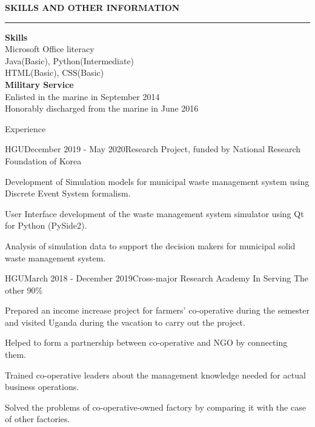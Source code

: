 \documentclass{resume} %
\begin{document}
{\bf \MakeUppercase {Skills and Other Information} %
  \sectionlineskip
  \hrule
  }
\begin{multicols}{2}
{\bf Skills}
  \\Microsoft Office literacy
  \\Java(Basic), Python(Intermediate) 
  \\HTML(Basic), CSS(Basic)
\\{\bf Military Service}
\\ Enlisted in the marine in September 2014
 \\ Honorably discharged from the marine in June 2016%
\end{multicols}{}
\begin{rSection}{Experience}

\begin{rSubsection}{HGU}{December 2019 - May 2020}{Research Project, funded by National Research Foundation of Korea}{}
\item Development of Simulation models for municipal waste management system using Discrete Event System formalism.
\item User Interface development of the waste management system simulator using Qt for Python (PySide2).
\item Analysis of simulation data to support the decision makers for municipal solid waste management system.
\end{rSubsection}
\begin{rSubsection}
{HGU}{March 2018 - December 2019}{Cross-major Research Academy In Serving The other 90\%}{}
\item Prepared an income increase project for farmers' co-operative during the semester and visited Uganda during the vacation to carry out the project.
\item Helped to form a partnership between co-operative and NGO by connecting them.
\item Trained co-operative leaders about the management knowledge needed for actual business operations.
\item Solved the problems of co-operative-owned factory by comparing it with the case of other factories.

\end{rSubsection}
\end{rSection}
\end{document}
